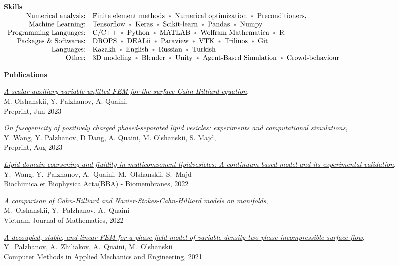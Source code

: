 \documentclass[10pt,letterpaper]{letter}
\newcommand{\gbullet}{\textcolor{gray}{\textbullet} }
\begin{document}
\textbf{Skills}\\
$\begin{array}{r l }
	\text{Numerical analysis:} & \text{Finite element methods \gbullet Numerical optimization \gbullet Preconditioners, } \\
	\text{Machine Learning:} & \text{Tensorflow \gbullet Keras \gbullet Scikit-learn \gbullet Pandas \gbullet Numpy} \\
	\text{Programming Languages:} & \text{C/C++ \gbullet Python \gbullet MATLAB \gbullet Wolfram Mathematica \gbullet R} \\
	\text{Packages \& Softwares:} & \text{DROPS \gbullet DEALii \gbullet Paraview \gbullet VTK \gbullet Trilinos \gbullet Git} \\
	\text{Languages:} & \text{Kazakh \gbullet English \gbullet Russian \gbullet Turkish} \\
	\text{Other:} & \text{3D modeling \gbullet Blender \gbullet Unity \gbullet Agent‑Based Simulation \gbullet Crowd‑behaviour}
\end{array}$



\newpage
\textbf{Publications}
\begin{etaremune}
	\item \textit{\href{https://arxiv.org/abs/2306.00318}{A scalar auxiliary variable unfitted FEM for the surface Cahn-Hilliard equation}},\\ M. Olshanskii, Y. Palzhanov, A. Quaini,\\
	Preprint, Jun 2023
	\item \textit{\href{https://arxiv.org/abs/2308.08425}{On fusogenicity of positively charged phased-separated lipid vesicles: experiments and computational simulations}},\\ Y. Wang, Y. Palzhanov, D Dang, A. Quaini, M. Olshanskii, S. Majd, \\
	Preprint, Aug 2023
	\item \textit{\href{https://doi.org/10.1016/j.bbamem.2022.183898}{Lipid domain coarsening and fluidity in multicomponent lipidvesicles: A continuum based model and its experimental validation}},\\ Y.~Wang, Y.~Palzhanov, A.~Quaini, M.~Olshanskii, S.~Majd\\
	Biochimica et Biophysica Acta(BBA) - Biomembranes, 2022	
	\item \textit{\href{https://link.springer.com/article/10.1007/s10013-022-00564-5}{A comparison of Cahn-Hilliard and Navier-Stokes-Cahn-Hilliard models on manifolds}},\\ M.~Olshanskii, Y.~Palzhanov, A.~Quaini \\
	Vietnam Journal of Mathematics, 2022	
	\item \textit{\href{https://www.sciencedirect.com/science/article/abs/pii/S0045782521004989}{A decoupled, stable, and linear FEM for a phase-field model of variable density two-phase incompressible surface flow}},\\ Y.~Palzhanov, A.~Zhiliakov, A.~Quaini, M.~Olshanskii\\
	Computer Methods in Applied Mechanics and Engineering, 2021
\end{etaremune}
\end{document}
